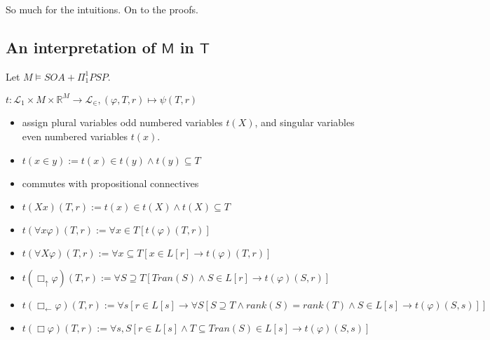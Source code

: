 \documentclass{article}
\theoremstyle{definition}
\newcommand{\bu}{\Box_\uparrow}
\newcommand{\bl}{\Box_\leftarrow}
\begin{document}
So much for the intuitions. On to the proofs.

\subsection{An interpretation of $\mathsf{M}$ in $\mathsf{T}$}
 Let $M \vDash SOA + \Pi_1^1 PSP$.

$t : \mathcal{L}_1 \times M \times \mathbb{R}^M \to \mathcal{L}_\in, (\varphi, T, r) \mapsto \psi(T, r)$
\begin{itemize}
    \item assign plural variables odd numbered variables $t(X)$, and singular variables even 
            numbered variables $t(x)$.
    \item $t(x \in y) := t(x) \in t(y) \wedge t(y) \subseteq T$
    \item commutes with propositional connectives 
    \item $t(Xx)(T, r) := t(x) \in t(X) \wedge t(X) \subseteq T$
    \item $t(\forall x \varphi)(T, r) := \forall x \in T [t(\varphi)(T, r)]$
    \item $t(\forall X \varphi)(T, r) := \forall x \subseteq T [x \in L[r] \rightarrow t(\varphi)(T, r)]$
    \item $t(\bu \varphi)(T, r) := \forall S \supseteq T [Tran(S) \wedge S \in L[r] \rightarrow t(\varphi)(S, r)]$
    \item $t(\bl \varphi)(T, r) := \forall s[ r \in L[s] \rightarrow \forall S[ S \supseteq T \wedge rank(S) = rank(T) \wedge S \in L[s] \rightarrow t(\varphi)(S, s)]]$
    \item $t(\Box \varphi)(T, r) := \forall s, S[r \in L[s] \wedge T \subseteq Tran(S) \in L[s]  \rightarrow t(\varphi)(S, s) ]$
\end{itemize}
\end{document}
